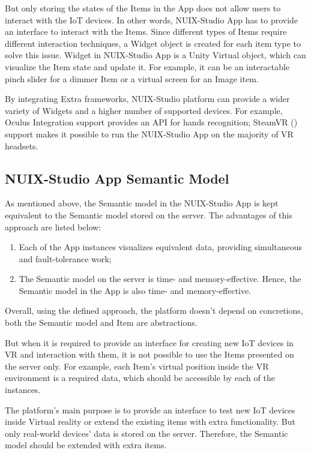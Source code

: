 But only storing the states of the Items in the App does not allow users to interact with the IoT devices. In other words, NUIX-Studio App has to provide an interface to interact with the Items. Since different types of Items require different interaction techniques, a Widget object is created for each item type to solve this issue.
Widget in NUIX-Studio App is a Unity Virtual object, which can visualize the Item state and update it. For example, it can be an interactable pinch slider for a dimmer Item or a virtual screen for an Image item.

By integrating Extra frameworks, NUIX-Studio platform can provide a wider variety of Widgets and a higher number of supported devices. For example, Oculus Integration support provides an API for hands recognition; SteamVR (\cite{SteamVR2021}) support makes it possible to run the NUIX-Studio App on the majority of VR headsets.

\subsection{NUIX-Studio App Semantic Model}

As mentioned above, the Semantic model in the NUIX-Studio App is kept equivalent to the Semantic model stored on the server. The advantages of this approach are listed below:

\begin{enumerate}
    \item Each of the App instances visualizes equivalent data, providing simultaneous and fault-tolerance work;
    \item The Semantic model on the server is time- and memory-effective. Hence, the Semantic model in the App is also time- and memory-effective.
\end{enumerate}

Overall, using the defined approach, the platform doesn't depend on concretions, both the Semantic model and Item are abstractions.

But when it is required to provide an interface for creating new IoT devices in VR and interaction with them, it is not possible to use the Items presented on the server only. For example, each Item's virtual position inside the VR environment is a required data, which should be accessible by each of the instances.

The platform's main purpose is to provide an interface to test new IoT devices inside Virtual reality or extend the existing items with extra functionality. But only real-world devices' data is stored on the server. Therefore, the Semantic model should be extended with extra items. 